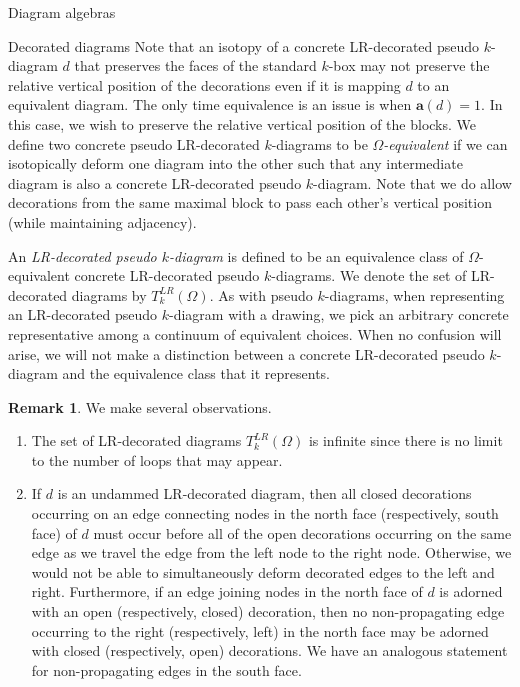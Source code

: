 \documentclass[11pt]{amsart}
\theoremstyle{definition}
\newtheorem{remark}[theorem]{Remark}
\numberwithin{equation}{section}
\renewcommand{\a}{\mathbf{a}}
\renewcommand{\(}{\left(}
\renewcommand{\)}{\right)}
\begin{document}
\begin{section}{Diagram algebras}
\begin{subsection}{Decorated diagrams}
Note that an isotopy of a concrete LR-decorated pseudo $k$-diagram $d$ that preserves the faces of the standard $k$-box may not preserve the relative vertical position of the decorations even if it is mapping $d$ to an equivalent diagram.  The only time equivalence is an issue is when $\a(d)=1$.  In this case, we wish to preserve the relative vertical position of the blocks.  We define two concrete pseudo LR-decorated $k$-diagrams to be \emph{$\Omega$-equivalent} if we can isotopically deform one diagram into the other such that any intermediate diagram is also a concrete LR-decorated pseudo $k$-diagram.  Note that we do allow decorations from the same maximal block to pass each other's vertical position (while maintaining adjacency).  

An \emph{LR-decorated pseudo $k$-diagram} is defined to be an equivalence class of $\Omega$-equivalent concrete LR-decorated pseudo $k$-diagrams.  We denote the set of LR-decorated diagrams by $T_{k}^{LR}(\Omega)$. As with pseudo $k$-diagrams, when representing an LR-decorated pseudo $k$-diagram with a drawing, we pick an arbitrary concrete representative among a continuum of equivalent choices.  When no confusion will arise, we will not make a distinction between a concrete LR-decorated pseudo $k$-diagram and the equivalence class that it represents. 

\begin{remark}\label{rem:LR-decorated}
We make several observations.
\begin{enumerate}
\item The set of LR-decorated diagrams $T_{k}^{LR}(\Omega)$ is infinite since there is no limit to the number of loops that may appear.

\item \label{rem:closed left open right} If $d$ is an undammed LR-decorated diagram, then all closed decorations occurring on an edge connecting nodes in the north face (respectively, south face) of $d$ must occur before all of the open decorations occurring on the same edge as we travel the edge from the left node to the right node. Otherwise, we would not be able to simultaneously deform decorated edges to the left and right.  Furthermore, if an edge joining nodes in the north face of $d$ is adorned with an open (respectively, closed) decoration, then no non-propagating edge occurring to the right (respectively, left) in the north face may be adorned with closed (respectively, open) decorations.  We have an analogous statement for non-propagating edges in the south face.


\end{enumerate}
\end{remark}
\end{subsection}
\end{section}
\end{document}
